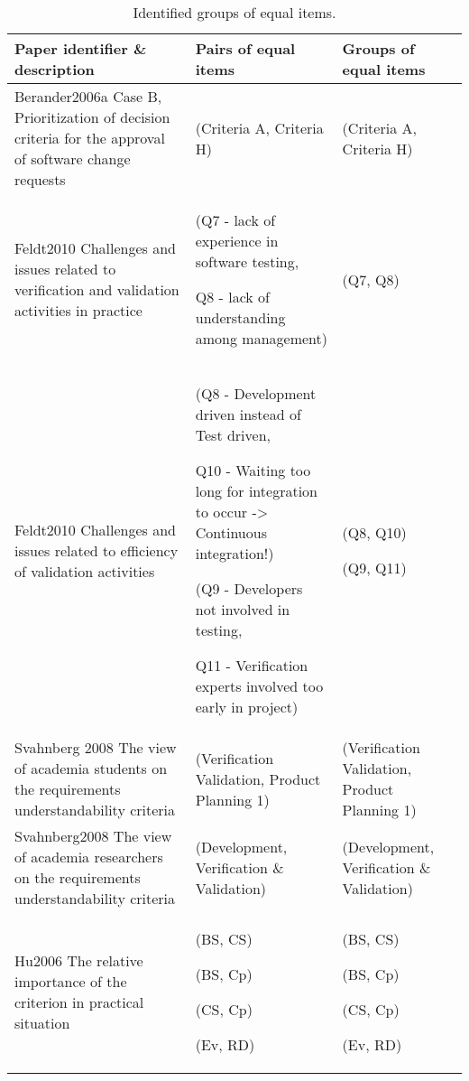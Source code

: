 %
\begin{table*}
	\scriptsize
\caption{\label{tab:ECVresult-1}Identified groups of equal items.}


\begin{tabular}{
|>{\centering}p{}
|>{\centering}p{}
|>{\centering}p{}|}
\hline 
Paper identifier \& description  & Pairs of equal items  & Groups of equal items\tabularnewline
\hline

Berander2006a \citep{Berander2006a} Case B, Prioritization of decision criteria for the approval of software
change requests  & (Criteria A, Criteria H)  & (Criteria A, Criteria H)\tabularnewline
\hline

Feldt2010 \citep{Feldt2010} Challenges and issues related to verification and validation activities in practice & 
(Q7 - lack of experience in software testing, 

Q8 - lack of understanding among management) &
(Q7, Q8)\tabularnewline
\hline 

Feldt2010 \citep{Feldt2010} Challenges and issues related to efficiency of validation activities &
(Q8 - \textquotedbl{}Development driven\textquotedbl{} instead of \textquotedbl{}Test driven\textquotedbl{},

Q10 - Waiting too long for integration to occur -> Continuous integration!) 

(Q9 - Developers not involved in testing, 

Q11 - Verification experts involved too early in project) &

(Q8, Q10) 

(Q9, Q11)
\tabularnewline
\hline 


Svahnberg 2008 \citep{Svahnberg2008} The view of academia students on the requirements understandability
criteria  & (Verification Validation, Product Planning 1)  & (Verification Validation, Product Planning 1)\tabularnewline
\hline 
Svahnberg2008 \citep{Svahnberg2008} The view of academia researchers on the requirements understandability
criteria  & (Development, Verification \& Validation) & (Development, Verification \& Validation)\tabularnewline
\hline 
Hu2006\citep{Hu2006} The relative importance of the criterion in practical situation & (BS, CS)

(BS, Cp)

(CS, Cp)

(Ev, RD) & (BS, CS)

(BS, Cp)

(CS, Cp)

(Ev, RD)\tabularnewline
\hline 



\end{tabular}
\end{table*}
